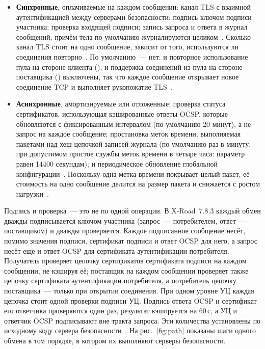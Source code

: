 \documentclass[conference,a4paper]{IEEEtran}
\newcommand{\newtext}[1]{{\color{blue}#1}}
\begin{document}
\begin{itemize}
  \item \textbf{Синхронные}, оплачиваемые на каждом сообщении: канал TLS с взаимной аутентификацией
  между серверами безопасности; подпись ключом подписи участника; проверка входящей
  подписи; запись запроса и ответа в журнал сообщений, причём тела по умолчанию журналируются
  целиком~\cite{xroadsyspar}. Сколько канал TLS стоит на одно сообщение, зависит от того,
  используются ли соединения повторно~\cite{naylor2014}. По умолчанию~--- нет: и повторное
  использование пула на стороне клиента (), и поддержка
  соединений из пула на стороне поставщика ()
  выключены, так что каждое сообщение открывает новое соединение TCP и выполняет рукопожатие
  TLS~\cite{xroadsyspar}.
  \item \textbf{Асинхронные}, амортизируемые или отложенные: проверка статуса сертификатов,
  использующая кэшированные ответы OCSP, которые обновляются с фиксированным интервалом (по умолчанию
  20 минут), а не запрос на каждое сообщение; простановка меток времени, выполняемая пакетами над
  хеш-цепочкой записей журнала (по умолчанию раз в минуту, при допустимом простое службы меток времени
  в четыре часа: параметр  равен 14400 секундам); и
  периодическое обновление глобальной конфигурации~\cite{kivimaki2020,xroadsyspar,ansper2013}.
  Поскольку одна метка времени покрывает целый пакет, её стоимость на одно сообщение делится на размер
  пакета и снижается с ростом нагрузки~\cite{xroadarcss,ansper2013}.
\end{itemize}

\newtext{Подпись и проверка~--- это не по одной операции. В X-Road~7.8.3 каждый обмен
дважды подписывается ключом участника (запрос~--- потребителем, ответ~--- поставщиком) и
дважды проверяется. Каждое подписанное сообщение несёт, помимо значения подписи, сертификат подписи
и ответ OCSP для него, а запрос несёт ещё и ответ OCSP для сертификата аутентификации
потребителя. Получатель проверяет цепочку сертификатов сертификата подписи
на каждом сообщении, не кэшируя её; поставщик на каждом сообщении проверяет также цепочку сертификата
аутентификации потребителя, а потребитель цепочку поставщика~--- только при
открытии соединения. При одном уровне УЦ каждая цепочка стоит одной проверки подписи УЦ.
Подпись ответа OCSP и сертификат его ответчика проверяются один раз, результат
кэшируется на 60\,с, а УЦ и ответчик OCSP подписывают вне тракта запроса. Эти количества
установлены по исходному коду сервера безопасности\newtext{~\cite{xroadsrc}}.}
\newtext{На рис.~\ref{fig:path} показаны шаги одного обмена в том порядке, в котором их выполняют
серверы безопасности.}
\end{document}
